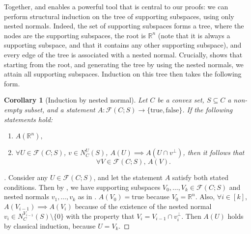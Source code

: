 \documentclass{article}
\theoremstyle{plain}
\newtheorem{corollary}{Corollary}[section]
\theoremstyle{definition}
\theoremstyle{remark}
\begin{document}
Together, 
and  
enables a powerful tool that is central to our proofs: we can
perform structural induction on the tree of supporting subspaces, using only nested normals.
Indeed, the set of supporting subspaces forms a tree, where the nodes
are the supporting subspaces, the root is
$\mathbb{R}^n$ (note that it is always a supporting subspace, and that
it contains any other supporting subspace), and every edge of the tree is
associated with a nested normal. Crucially, 
shows that starting from the root, and generating the tree by using the nested
normals, we attain all supporting subspaces. Induction on this tree
then takes the following form.
\begin{corollary}[Induction by nested normal]
\label{loc:induction_by_nested_normal.statement}
Let $C$ be a convex set, $S \subseteq C$ a non-empty subset, and a statement $A:\mathcal{F}(C;S) \to \{\text{true}, \text{false}\}$. If the following statements hold: 
\begin{enumerate}
\item $A(\mathbb{R}^n),$
\item  $\forall U \in \mathcal{F}(C; S)$, $v \in N^U_C(S)$, $A(U) \implies A(U \cap v^\perp)$,
then it follows that
\begin{equation*}
\forall V \in \mathcal{F}(C;S), \, A(V).
\end{equation*}
\end{enumerate}
\end{corollary}
\begin{proof}[\hypertarget{loc:induction_by_nested_normal.proof}Proof of \Cref{loc:induction_by_nested_normal.statement}]

Consider any $U \in \mathcal{F}(C;S)$, and let the statement $A$ satisfy both
stated conditions. Then by ,
we have supporting subspaces $V_0, \ldots, V_k \in \mathcal{F}(C;S)$
and nested normals $v_1, \ldots,  v_k$ as in . $A(V_0)= \mathrm{true}$ 
because $V_0 = \mathbb{R}^n$. Also, $\forall i \in [k]$, $A(V_{i-1}) \implies
A(V_i)$ because of the existence
of the nested normal $v_i \in N_C^{V_{i-1}}(S) \setminus \{0\}$ with the property that 
$V_i= V_{i-1} \cap v_i^\perp$. Then $A(U)$ holds by classical induction,
because $U = V_k$.
\end{proof}
\end{document}
